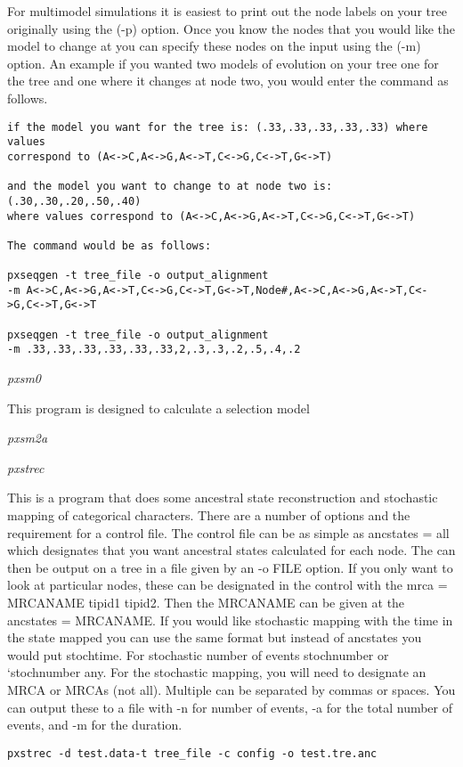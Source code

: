 \documentclass[12pt,letterpaper]{article}
\renewcommand{\subsection}[1]{%
\bigskip
\begin{center}
\begin{large}
\normalfont\itshape #1
\end{large}
\end{center}}
\begin{document}
For multimodel simulations it is easiest to print out the node labels on your tree originally using the (-p) option. Once you know the nodes that you would like the model to change at you can specify these nodes on the input using the (-m) option. An example if you wanted two models of evolution on your tree one for the tree and one where it changes at node two, you would enter the command as follows.


\begin{flushleft}
\begin{verbatim}
if the model you want for the tree is: (.33,.33,.33,.33,.33) where values 
correspond to (A<->C,A<->G,A<->T,C<->G,C<->T,G<->T)

and the model you want to change to at node two is: (.30,.30,.20,.50,.40)
where values correspond to (A<->C,A<->G,A<->T,C<->G,C<->T,G<->T)

The command would be as follows: 

pxseqgen -t tree_file -o output_alignment 
-m A<->C,A<->G,A<->T,C<->G,C<->T,G<->T,Node#,A<->C,A<->G,A<->T,C<->G,C<->T,G<->T

pxseqgen -t tree_file -o output_alignment 
-m .33,.33,.33,.33,.33,.33,2,.3,.3,.2,.5,.4,.2
\end{verbatim}
\end{flushleft}


\subsection{pxsm0}

This program is designed to calculate a selection model

\subsection{pxsm2a}

\subsection{pxstrec}

This is a program that does some ancestral state reconstruction and stochastic mapping of categorical characters. There are a number of options and the requirement for a control file. The control file can be as simple as ancstates = all which designates that you want ancestral states calculated for each node. The can then be output on a tree in a file given by an -o FILE option. If you only want to look at particular nodes, these can be designated in the control with the mrca = MRCANAME tipid1 tipid2. Then the MRCANAME can be given at the ancstates = MRCANAME. If you would like stochastic mapping with the time in the state mapped you can use the same format but instead of ancstates you would put stochtime. For stochastic number of events stochnumber or `stochnumber any. For the stochastic mapping, you will need to designate an MRCA or MRCAs (not all). Multiple can be separated by commas or spaces. You can output these to a file with -n for number of events, -a for the total number of events, and -m for the duration. 

\begin{flushleft}
\begin{verbatim}
pxstrec -d test.data-t tree_file -c config -o test.tre.anc
\end{verbatim}
\end{flushleft}
\end{document}
